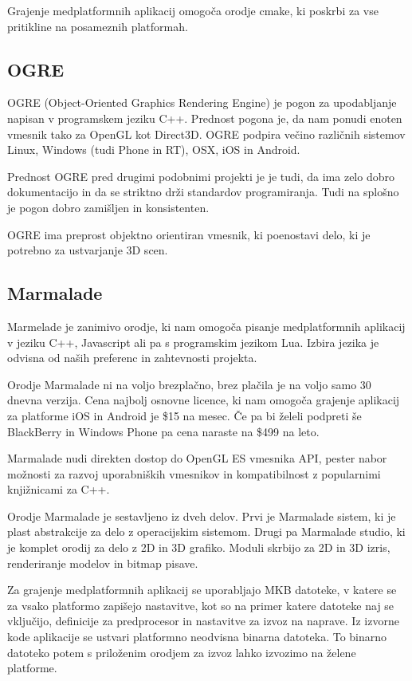Grajenje medplatformnih aplikacij omogoča orodje cmake, ki poskrbi za vse pritikline na posameznih platformah. 

\subsection{OGRE}

OGRE (Object-Oriented Graphics Rendering Engine) \cite{ogre} je pogon za upodabljanje napisan v programskem jeziku C++. Prednost pogona je, da nam ponudi enoten vmesnik tako za OpenGL kot Direct3D. OGRE podpira večino različnih sistemov Linux, Windows (tudi Phone in RT), OSX, iOS in Android.

Prednost OGRE pred drugimi podobnimi projekti je je tudi, da ima zelo dobro dokumentacijo in da se striktno drži standardov programiranja. Tudi na splošno je pogon dobro zamišljen in konsistenten.

OGRE ima preprost objektno orientiran vmesnik, ki poenostavi delo, ki je potrebno za ustvarjanje 3D scen.

\subsection{Marmalade}

Marmelade \cite{marmalade} je zanimivo orodje, ki nam omogoča pisanje medplatformnih aplikacij v jeziku C++, Javascript ali pa s programskim jezikom Lua. Izbira jezika je odvisna od naših preferenc in zahtevnosti projekta.

Orodje Marmalade ni na voljo brezplačno, brez plačila je na voljo samo 30 dnevna verzija. Cena najbolj osnovne licence, ki nam omogoča grajenje aplikacij za platforme iOS in Android je \$15 na mesec. Če pa bi želeli podpreti še BlackBerry in Windows Phone pa cena naraste na \$499 na leto.

Marmalade nudi direkten dostop do OpenGL ES vmesnika API, pester nabor možnosti za razvoj uporabniških vmesnikov in kompatibilnost z popularnimi knjižnicami za C++. 

Orodje Marmalade je sestavljeno iz dveh delov. Prvi je Marmalade sistem, ki je plast abstrakcije za delo z operacijskim sistemom. Drugi pa Marmalade studio, ki je komplet orodij za delo z 2D in 3D grafiko. Moduli skrbijo za 2D in 3D izris, renderiranje modelov in bitmap pisave.

Za grajenje medplatformnih aplikacij se uporabljajo MKB datoteke, v katere se za vsako platformo zapišejo nastavitve, kot so na primer katere datoteke naj se vključijo, definicije za predprocesor in nastavitve za izvoz na naprave. Iz izvorne kode aplikacije se ustvari platformno neodvisna binarna datoteka. To binarno datoteko potem s priloženim orodjem za izvoz lahko izvozimo na želene platforme.

